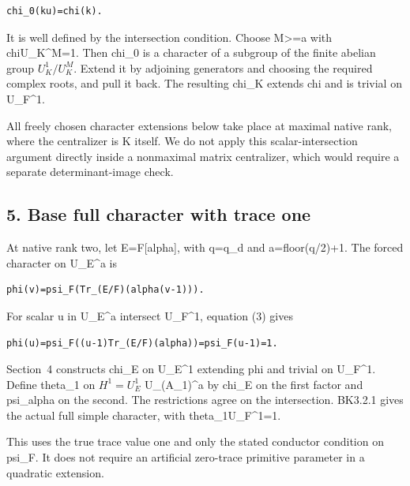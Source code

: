 \begin{Verbatim}[fontsize=\small,breaklines=true,breakanywhere=true]
chi_0(ku)=chi(k).
\end{Verbatim}

It is well defined by the intersection condition. Choose M\textgreater=a
with chi\textbar U\_K\^{}M=1. Then chi\_0 is a character of a subgroup
of the finite abelian group \(U_K^1/U_K^M\). Extend it by
adjoining generators and choosing the required complex roots, and pull
it back. The resulting chi\_K extends chi and is trivial on U\_F\^{}1.

All freely chosen character extensions below take place at maximal
native rank, where the centralizer is K itself. We do not apply this
scalar-intersection argument directly inside a nonmaximal matrix
centralizer, which would require a separate determinant-image check.

\hypertarget{dyadic_character-base-full-character-with-trace-one}{%
\subsection{5. Base full character with trace
one}\label{dyadic_character-base-full-character-with-trace-one}}

At native rank two, let E=F{[}alpha{]}, with q=q\_d and a=floor(q/2)+1.
The forced character on U\_E\^{}a is

\begin{Verbatim}[fontsize=\small,breaklines=true,breakanywhere=true]
phi(v)=psi_F(Tr_(E/F)(alpha(v-1))).
\end{Verbatim}

For scalar u in U\_E\^{}a intersect U\_F\^{}1, equation (3) gives

\begin{Verbatim}[fontsize=\small,breaklines=true,breakanywhere=true]
phi(u)=psi_F((u-1)Tr_(E/F)(alpha))=psi_F(u-1)=1.
\end{Verbatim}

Section~4 constructs chi\_E on U\_E\^{}1 extending phi and trivial on
U\_F\^{}1. Define theta\_1 on \(H^1=U_E^1\) U\_(A\_1)\^{}a
by chi\_E on the first factor and psi\_alpha on the second. The
restrictions agree on the intersection. BK3.2.1 gives the actual full
simple character, with theta\_1\textbar U\_F\^{}1=1.

This uses the true trace value one and only the stated conductor
condition on psi\_F. It does not require an artificial zero-trace
primitive parameter in a quadratic extension.


